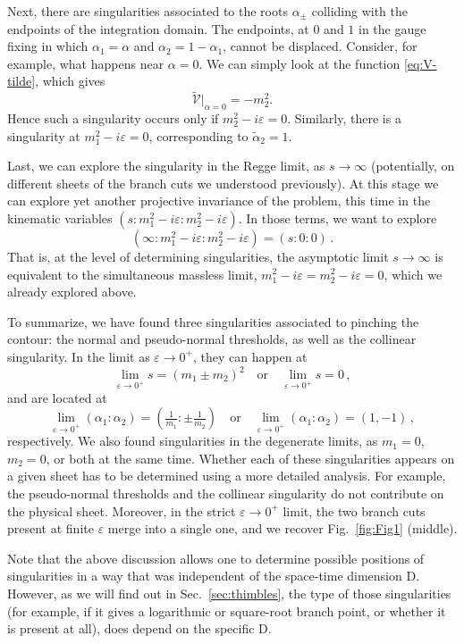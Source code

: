 \documentclass[12pt]{article}
\numberwithin{figure}{section}
\def \be {\begin{equation}}
\def \ee {\end{equation}}
\def \D {\mathrm{D}}
\def \eps {\varepsilon}
\def \V {\mathcal{V}}
\begin{document}
	Next, there are singularities associated to the roots $\alpha_\pm$ colliding with the endpoints of the integration domain. The endpoints, at $0$ and $1$ in the gauge fixing in which $\alpha_1=\alpha$ and $\alpha_2=1-\alpha_1$, cannot be displaced. Consider, for example, what happens near $\alpha = 0$. We can simply look at the function \eqref{eq:V-tilde}, which gives
	\be\label{eq:bubble-subleading}
	\tilde{\V}|_{\alpha = 0} = -m_2^2.
	\ee
	Hence such a singularity occurs only if $m_2^2 - i\eps = 0$. Similarly, there is a singularity at $m_1^2 - i\eps = 0$, corresponding to $\tilde{\alpha}_2 = 1$.
	
	Last, we can explore the singularity in the Regge limit, as $s \to \infty$ (potentially, on different sheets of the branch cuts we understood previously). At this stage we can explore yet another projective invariance of the problem, this time in the kinematic variables $(s : m_1^2{-}i\eps: m_2^2{-}i\eps)$. In those terms, we want to explore
	\be
	(\infty : m_1^2{-}i\eps : m_2^2{-}i\eps) = (s : 0 : 0) \,.
	\ee
	That is, at the level of determining singularities, the asymptotic limit $s \to \infty$ is equivalent to the simultaneous massless limit, $m_1^2 - i\eps = m_2^2 - i\eps = 0$, which we already explored above.
	
	To summarize, we have found three singularities associated to pinching the contour: the normal and pseudo-normal thresholds, as well as the collinear singularity. In the limit as $\eps\to0^+$, they can happen at
	\be
	\lim_{\eps \to 0^+} s = (m_1 {\pm} m_2)^2\quad\mathrm{or}\quad \lim_{\eps \to 0^+} s = 0 \,,
	\ee
	and are located at
	\be
	\lim_{\eps \to 0^+} (\alpha_1 : \alpha_2) = (\tfrac{1}{m_1} : \pm\tfrac{1}{m_2}) \quad\mathrm{or}\quad \lim_{\eps \to 0^+} (\alpha_1 : \alpha_2) = (1,-1) \,,
	\ee
	respectively.
	We also found singularities in the degenerate limits, as $m_1 = 0$, $m_2 = 0$, or both at the same time. Whether each of these singularities appears on a given sheet has to be determined using a more detailed analysis. For example, the pseudo-normal thresholds and the collinear singularity do not contribute on the physical sheet. Moreover, in the strict $\eps \to 0^+$ limit, the two branch cuts present at finite $\eps$ merge into a single one, and we recover Fig.~\ref{fig:Fig1} (middle).
	
	Note that the above discussion allows one to determine possible positions of singularities in a way that was independent of the space-time dimension $\D$. However, as we will find out in Sec.~\ref{sec:thimbles}, the type of those singularities (for example, if it gives a logarithmic or square-root branch point, or whether it is present at all), does depend on the specific $\D$.
	
\end{document}
